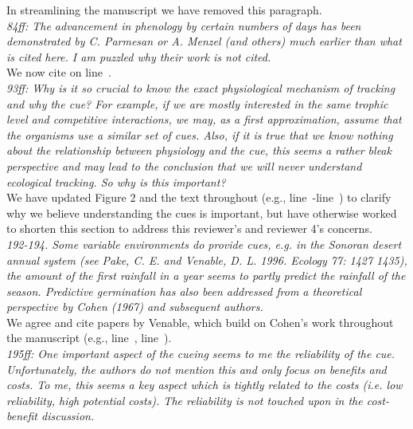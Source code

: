 \documentclass[11pt,letterpaper]{article}
\newcommand{\lr}[1]{line~\lineref{#1}}
\begin{document}
In streamlining the manuscript we have removed this paragraph. \\ 

\emph{84ff: The advancement in phenology by certain numbers of days has been demonstrated by C.
Parmesan or A. Menzel (and others) much earlier than what is cited here. I am puzzled why
their work is not cited.}\\

We now cite \citet{Menzel:2006xn,Parmesan:2006cr} on \lr{r1ass1}.\\

\emph{93ff: Why is it so crucial to know the exact physiological mechanism of tracking and why the
cue? For example, if we are mostly interested in the same trophic level and competitive
interactions, we may, as a first approximation, assume that the organisms use a similar set
of cues. Also, if it is true that we know nothing about the relationship between physiology
and the cue, this seems a rather bleak perspective and may lead to the conclusion that we
will never understand ecological tracking. So why is this important?}\\

We have updated Figure 2 and the text throughout (e.g., \lr{r3birdsS}-\lr{r3birdsE}) to clarify why we believe understanding the cues is important, but have otherwise worked to shorten this section to address this reviewer's and reviewer 4's concerns. \\

\emph{192-194. Some variable environments do provide cues, e.g. in the Sonoran desert annual system
(see Pake, C. E. and Venable, D. L. 1996. Ecology 77: 1427 1435), the amount of the first
rainfall in a year seems to partly predict the rainfall of the season. Predictive germination
has also been addressed from a theoretical perspective by Cohen (1967) and subsequent
authors.}\\

We agree and cite papers by Venable, which build on Cohen's work throughout the manuscript (e.g., \lr{r1ass2}, \lr{r1ass4}).\\

\emph{195ff: One important aspect of the cueing seems to me the reliability of the cue.
Unfortunately, the authors do not mention this and only focus on benefits and costs. To me,
this seems a key aspect which is tightly related to the costs (i.e. low reliability, high
potential costs). The reliability is not touched upon in the cost-benefit discussion.}\\
\end{document}
